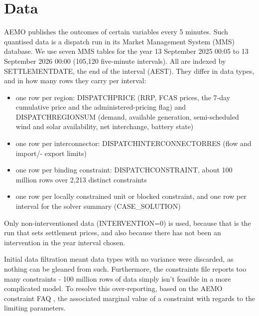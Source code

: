 \section{Data}\label{ch:data}

AEMO publishes the outcomes of certain variables every 5 minutes. Such quantised data is a dispatch run in its Market Management System (MMS) database. We use seven MMS tables for the year 13 September 2025 00:05 to 13 September 2026 00:00 (105,120 five-minute intervals). All are indexed by SETTLEMENTDATE, the end of the interval (AEST). They differ in data types, and in how many rows they carry per interval:
\begin{itemize}
    \item one row per region: DISPATCHPRICE (RRP, FCAS prices, the 7-day cumulative price
    and the administered-pricing flag) and DISPATCHREGIONSUM (demand, available
    generation, semi-scheduled wind and solar availability, net interchange, battery state)
    \item one row per interconnector: DISPATCHINTERCONNECTORRES (flow and import/-
    export limits)
    \item one row per binding constraint: DISPATCHCONSTRAINT, about 100 million rows over
    2,213 distinct constraints
    \item one row per locally constrained unit or blocked constraint, and one row per interval for the solver summary (CASE\_SOLUTION)
\end{itemize}

Only non-interventioned data (INTERVENTION=0) is used, because that is the run that
sets settlement prices, and also because there has not been an intervention in the year interval chosen. 

Initial data filtration meant data types with no variance were discarded, as nothing can be gleaned from such.  Furthermore, the constraints file reports too many constraints - 100 million rows of data simply isn't feasible in a more complicated model. To resolve this over-reporting, based on the AEMO constraint FAQ \cite{aemofaq}, the associated marginal value of a constraint with regards to the limiting parameters. 

